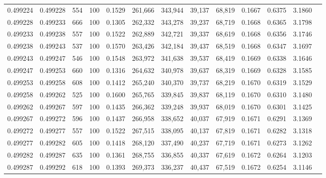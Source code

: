 \begin{tabular}{rrrrrrrrrrrrr}
0.499224 & 0.499228 &   554 & 100 &                                     0.1529 & 261,666 & 343,944 &  39,137 &  68,819 & 0.1667 & 0.6375 & 3.1860 \\
0.499228 & 0.499233 &   666 & 100 &                                     0.1305 & 262,332 & 343,278 &  39,237 &  68,719 & 0.1668 & 0.6365 & 3.1798 \\
0.499233 & 0.499238 &   557 & 100 &                                     0.1522 & 262,889 & 342,721 &  39,337 &  68,619 & 0.1668 & 0.6356 & 3.1746 \\
0.499238 & 0.499243 &   537 & 100 &                                     0.1570 & 263,426 & 342,184 &  39,437 &  68,519 & 0.1668 & 0.6347 & 3.1697 \\
0.499243 & 0.499247 &   546 & 100 &                                     0.1548 & 263,972 & 341,638 &  39,537 &  68,419 & 0.1669 & 0.6338 & 3.1646 \\
0.499247 & 0.499253 &   660 & 100 &                                     0.1316 & 264,632 & 340,978 &  39,637 &  68,319 & 0.1669 & 0.6328 & 3.1585 \\
0.499253 & 0.499258 &   608 & 100 &                                     0.1412 & 265,240 & 340,370 &  39,737 &  68,219 & 0.1670 & 0.6319 & 3.1529 \\
0.499258 & 0.499262 &   525 & 100 &                                     0.1600 & 265,765 & 339,845 &  39,837 &  68,119 & 0.1670 & 0.6310 & 3.1480 \\
0.499262 & 0.499267 &   597 & 100 &                                     0.1435 & 266,362 & 339,248 &  39,937 &  68,019 & 0.1670 & 0.6301 & 3.1425 \\
0.499267 & 0.499272 &   596 & 100 &                                     0.1437 & 266,958 & 338,652 &  40,037 &  67,919 & 0.1671 & 0.6291 & 3.1369 \\
0.499272 & 0.499277 &   557 & 100 &                                     0.1522 & 267,515 & 338,095 &  40,137 &  67,819 & 0.1671 & 0.6282 & 3.1318 \\
0.499277 & 0.499282 &   605 & 100 &                                     0.1418 & 268,120 & 337,490 &  40,237 &  67,719 & 0.1671 & 0.6273 & 3.1262 \\
0.499282 & 0.499287 &   635 & 100 &                                     0.1361 & 268,755 & 336,855 &  40,337 &  67,619 & 0.1672 & 0.6264 & 3.1203 \\
0.499287 & 0.499292 &   618 & 100 &                                     0.1393 & 269,373 & 336,237 &  40,437 &  67,519 & 0.1672 & 0.6254 & 3.1146 \\

\end{tabular}
